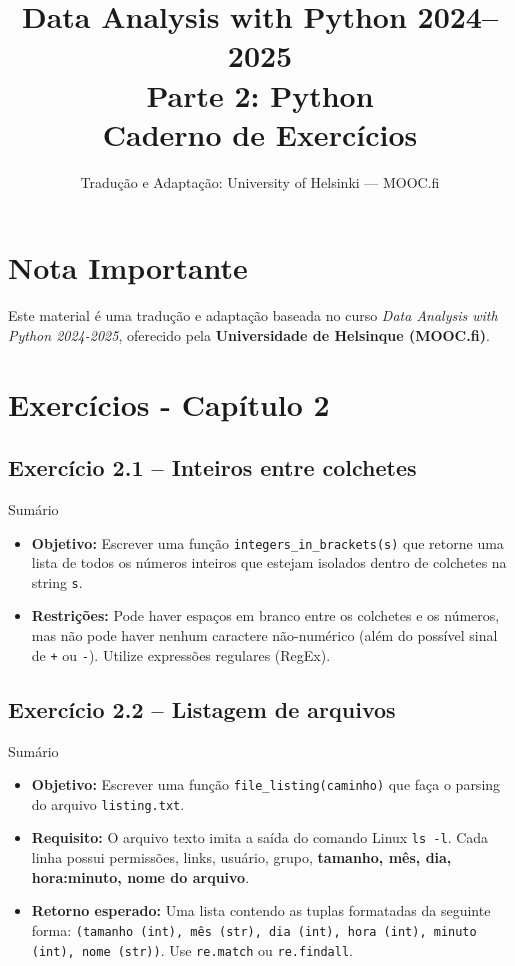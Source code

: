 \documentclass[11pt,a4paper]{article}
\title{\textbf{Data Analysis with Python 2024--2025}\\Parte 2: Python\\\large Caderno de Exercícios}
\author{Tradução e Adaptação: University of Helsinki --- MOOC.fi}
\date{}
\begin{document}
\maketitle

\section*{Nota Importante}
Este material é uma tradução e adaptação baseada no curso \textit{Data Analysis with Python 2024-2025}, oferecido pela \textbf{Universidade de Helsinque (MOOC.fi)}.

\tableofcontents
\newpage

\section{Exercícios - Capítulo 2}

\subsection*{Exercício 2.1 -- Inteiros entre colchetes}

\begin{exercicio}{Sumário}
\begin{itemize}
    \item \textbf{Objetivo:} Escrever uma função \texttt{integers\_in\_brackets(s)} que retorne uma lista de todos os números inteiros que estejam isolados dentro de colchetes na string \texttt{s}.
    \item \textbf{Restrições:} Pode haver espaços em branco entre os colchetes e os números, mas não pode haver nenhum caractere não-numérico (além do possível sinal de \texttt{+} ou \texttt{-}). Utilize expressões regulares (RegEx).
\end{itemize}
\end{exercicio}

\subsection*{Exercício 2.2 -- Listagem de arquivos}

\begin{exercicio}{Sumário}
\begin{itemize}
    \item \textbf{Objetivo:} Escrever uma função \texttt{file\_listing(caminho)} que faça o parsing do arquivo \texttt{listing.txt}.
    \item \textbf{Requisito:} O arquivo texto imita a saída do comando Linux \texttt{ls -l}. Cada linha possui permissões, links, usuário, grupo, \textbf{tamanho, mês, dia, hora:minuto, nome do arquivo}.
    \item \textbf{Retorno esperado:} Uma lista contendo as tuplas formatadas da seguinte forma: \texttt{(tamanho (int), mês (str), dia (int), hora (int), minuto (int), nome (str))}. Use \texttt{re.match} ou \texttt{re.findall}.
\end{itemize}
\end{exercicio}
\end{document}
